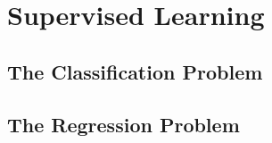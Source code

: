 \chapter{Supervised Learning}
\lipsum

\section{The Classification Problem}
\lipsum

\section{The Regression Problem}
\lipsum